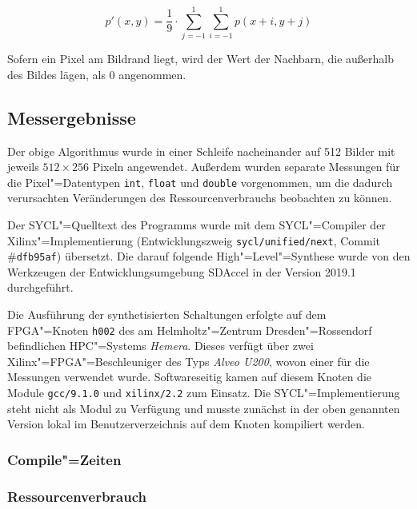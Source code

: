 \begin{equation}
    p'(x, y) = \frac{1}{9} \cdot \sum_{j = {-1}}^{1} \sum_{i = {-1}}^{1} p(x + i, y + j)
\end{equation}

Sofern ein Pixel am Bildrand liegt, wird der Wert der Nachbarn, die außerhalb
des Bildes lägen, als $0$ angenommen.

\subsection{Messergebnisse}

Der obige Algorithmus wurde in einer Schleife nacheinander auf \num{512} Bilder
mit jeweils $512 \times 256$ Pixeln angewendet. Außerdem wurden separate
Messungen für die Pixel"=Datentypen \texttt{int}, \texttt{float} und
\texttt{double} vorgenommen, um die dadurch verursachten Veränderungen des
Ressourcenverbrauchs beobachten zu können.

Der SYCL"=Quelltext des Programms wurde mit dem SYCL"=Compiler der
Xilinx"=Implementierung (Entwicklungszweig \texttt{sycl/unified/next},
Commit \#\texttt{dfb95af}) übersetzt. Die darauf folgende High"=Level"=Synthese
wurde von den Werkzeugen der Entwicklungsumgebung SDAccel in der Version 2019.1
durchgeführt.

Die Ausführung der synthetisierten Schaltungen erfolgte auf dem FPGA"=Knoten
\texttt{h002} des am Helmholtz"=Zentrum Dresden"=Rossendorf befindlichen
HPC"=Systems \textit{Hemera}. Dieses verfügt über zwei
Xilinx"=FPGA"=Beschleuniger des Typs \textit{Alveo U200}, wovon einer für die
Messungen verwendet wurde. Softwareseitig kamen auf diesem Knoten die Module
\texttt{gcc/9.1.0} und \texttt{xilinx/2.2} zum Einsatz. Die
SYCL"=Implementierung steht nicht als Modul zu Verfügung und musste zunächst
in der oben genannten Version lokal im Benutzerverzeichnis auf dem Knoten
kompiliert werden.

\subsubsection{Compile"=Zeiten}

\subsubsection{Ressourcenverbrauch}

